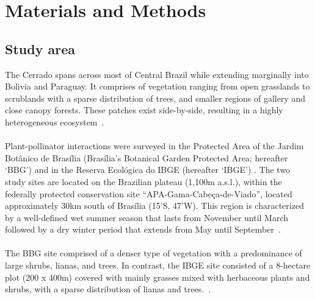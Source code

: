 \documentclass[11pt]{article}
\begin{document}
\newpage
\section{Materials and Methods} %
\subsection{Study area}
The Cerrado spans across most of Central Brazil while extending marginally into Bolivia and Paraguay. It comprises of vegetation ranging from open grasslands to scrublands with a sparse distribution of trees, and smaller regions of gallery and close canopy forests. These patches exist side-by-side, resulting in a highly heterogeneous ecosystem~\citep{Gottsberger2006}. \\
\\
Plant-pollinator interactions were surveyed in the Protected Area of the Jardim Bot\^anico de Bras\'ilia (Bras\'ilia's Botanical Garden Protected Area; hereafter `BBG') and in the Reserva Ecol\'ogica do IBGE (hereafter `IBGE') . The two study sites are located on the Brazilian plateau (1,100m a.s.l.), within the federally protected conservation site ``APA-Gama-Cabe\c ca-de-Viado'', located approximately 30km south of Bras\'ilia (15'S, 47'W). This region is characterized by a well-defined wet summer season that lasts from November until March followed by a dry winter period that extends from May until September~\citep{Gottsberger2006a}.\\
\\
The BBG site comprised of a denser type of vegetation with a predominance of large shrubs, lianas, and trees. In contrast, the IBGE site consisted of a 8-hectare plot (200 x 400m) covered with mainly grasses mixed with herbaceous plants and shrubs, with a sparse distribution of lianas and trees.~\citep{Eiten1972}.
\end{document}
